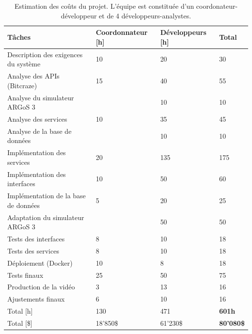 \documentclass{mistcoursedoc}
\begin{document}
\begin{table}[h!]
  \centering
  \begin{tabular}{M{6.5cm} M{3.5cm} M{3.5cm} M{1.5cm}}
    \hline
    \textbf{Tâches}                      & \textbf{Coordonnateur [h]} & \textbf{Développeurs [h]} & \textbf{Total} \tabularnewline\hline
    Description des exigences du système & 10                        & 20                        & 30 \tabularnewline
    Analyse des APIs (Bitcraze)          & 15                        & 40                        & 55 \tabularnewline
    Analyse du simulateur ARGoS 3        &                           & 10                        & 10 \tabularnewline
    Analyse des services                 & 10                        & 35                        & 45 \tabularnewline
    Analyse de la base de données        &                           & 10                        & 10 \tabularnewline
    Implémentation des services          & 20                        & 135                       & 175 \tabularnewline
    Implémentation des interfaces        & 10                        & 50                        & 60 \tabularnewline
    Implémentation de la base de données & 5                         & 20                        & 25 \tabularnewline
    Adaptation du simulateur ARGoS 3     &                           & 50                        & 50 \tabularnewline
    Tests des interfaces                 & 8                         & 10                        & 18 \tabularnewline
    Tests des services                   & 8                         & 10                        & 18\tabularnewline
    Déploiement (Docker)                 & 10                        & 8                         & 18\tabularnewline
    Tests finaux                         & 25                        & 50                        & 75 \tabularnewline
    Production de la vidéo               & 3                         & 13                        & 16 \tabularnewline
    Ajustements finaux                   & 6                         & 10                        & 16 \tabularnewline\hline
    Total [h]                            & 130                        & 471                       & \textbf{601h} \tabularnewline
    Total [\$]                           & 18'850\$                    & 61'230\$                    & \textbf{80'080\$} \tabularnewline
    \hline
  \end{tabular}
  \caption{Estimation des coûts du projet. L'équipe est constituée d'un coordonateur-développeur et de 4 développeurs-analystes.}
\end{table}
\end{document}
